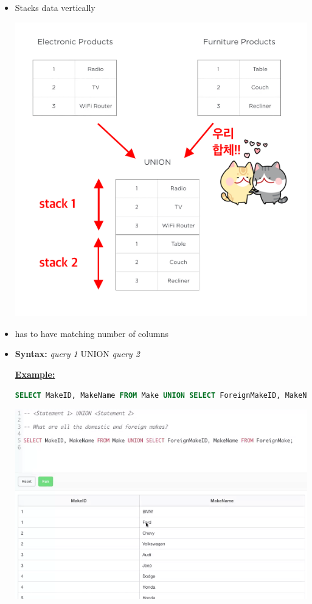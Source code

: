 \documentclass[12pt]{article}
\begin{document}
\begin{itemize}
    \item Stacks data vertically

    \begin{center}
    \includegraphics[width=0.8\linewidth]{images/part_5_notes_2.png}
    \end{center}

    \item has to have matching number of columns
    \item \textbf{Syntax:} \textit{query 1} UNION \textit{query 2}

    \bigskip

    \underline{\textbf{Example:}}

    \bigskip

    \begin{lstlisting}[language=SQL]
    SELECT MakeID, MakeName FROM Make UNION SELECT ForeignMakeID, MakeName FROM ForeignMake;
    \end{lstlisting}

    \bigskip

    \begin{center}
    \includegraphics[width=0.8\linewidth]{images/part_5_notes_1.png}
    \end{center}


\end{itemize}
\end{document}
